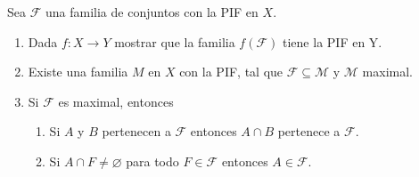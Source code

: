 \documentclass{article}
\theoremstyle{plain}
\theoremstyle{definition}
\newenvironment{ejercicio}[1]{\begin{trivlist}
\item[\hskip \labelsep {\bfseries Ejercicio}\hskip \labelsep {\bfseries #1.}]}{\end{trivlist}}
\begin{document}
\begin{ejercicio}{3}
    Sea \( \mathcal{F} \) una familia de conjuntos con la PIF en \( X \).
    \begin{enumerate}
        \item[(a)] Dada \( f : X \rightarrow Y \) mostrar que la familia \( f(\mathcal{F}) \) tiene la PIF en Y.
        \item[(b)] Existe una familia \( M \) en \( X \) con la PIF, tal que \( \mathcal{F}\subseteq\mathcal{M} \) y \( \mathcal{M} \) maximal.
        \item[(c)] Si \( \mathcal{F} \) es maximal, entonces
              \begin{enumerate}
                  \item[i.] Si \( A \) y \( B \) pertenecen a \( \mathcal{F} \) entonces \(A \cap B \) pertenece a \( \mathcal{F} \).
                  \item[ii.] Si \( A \cap F \ne\varnothing \) para todo \(F\in\mathcal{F}\) entonces \(A\in\mathcal{F}\).
              \end{enumerate}
    \end{enumerate}
\end{ejercicio}
\end{document}
